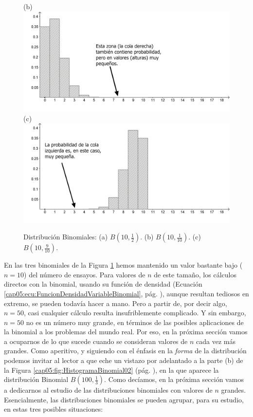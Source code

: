 \begin{figure}[p]
\begin{center}
\begin{bn}
    (b)\\
    \includegraphics[width=11.5cm]{../fig/Cap05-ZooBinomial02-bn.png}\\[3mm]
    (c)\\
    \includegraphics[width=11.5cm]{../fig/Cap05-ZooBinomial03-bn.png}\\
	\end{bn}
	\caption{Distribución Binomiales: (a)  $B(10,\frac{1}{2})$.  (b) $B(10,\frac{1}{10})$.
    (c) $B(10,\frac{9}{10})$.}
	\label{cap01:fig:ZooBinomial01}
    \end{center}
  \end{figure}

En las tres binomiales de la Figura \ref{cap01:fig:ZooBinomial01} hemos mantenido un valor bastante
bajo ($n=10$) del número de ensayos. Para valores de $n$ de este tamaño, los cálculos directos con
la binomial, usando su función de densidad (Ecuación
\ref{cap05:ecu:FuncionDensidadVariableBinomial}, pág.
\pageref{cap05:ecu:FuncionDensidadVariableBinomial}), aunque resultan tediosos en extremo, se
pueden todavía hacer a mano. Pero a partir de, por decir algo, $n=50$, casi cualquier cálculo
resulta insufriblemente complicado. Y sin embargo, $n=50$ no es un número muy grande, en términos
de las posibles aplicaciones de la binomial a los problemas del mundo real. Por eso, en la próxima
sección vamos a ocuparnos de lo que sucede cuando se consideran valores de $n$ cada vez más
grandes. Como aperitivo, y siguiendo con el énfasis en la {\em forma} de la distribución podemos
invitar al lector a que eche un vistazo por adelantado a la parte (b) de la Figura
\ref{cap05:fig:HistogramaBinomial02} (pág. \pageref{cap05:fig:HistogramaBinomial02}), en la que
aparece la distribución Binomial $B(100,\frac{1}{3})$. Como decíamos, en la próxima sección vamos a
dedicarnos al estudio de las distribuciones binomiales con valores de $n$ grandes. Esencialmente,
las distribuciones binomiales se pueden agrupar, para su estudio, en estas tres posibles
situaciones:

